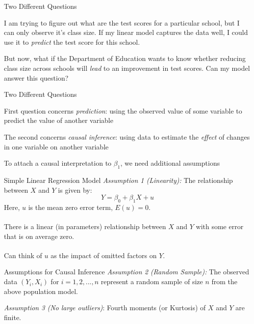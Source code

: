 \documentclass{./../div_teaching_slides}
\begin{document}

\begin{frame}{Two Different Questions}
\begin{witemize}
  \item I am trying to figure out what are the test scores for a particular school, but I can only observe it's class size. If my linear model captures the data well, I could use it to \textit{predict} the test score for this school.
  \item But now, what if the Department of Education wants to know whether reducing class size across schools will \textit{lead} to an improvement in test scores. Can my model answer this question?
\end{witemize}
\end{frame}

\begin{frame}{Two Different Questions}
\begin{witemize}
  \item First question concerns \textit{prediction}: using the observed value of some variable to predict the value of another variable
  \item The second concerns \textit{causal inference}: using data to estimate the \textit{effect} of changes in one variable on another variable
  \item To attach a causal interpretation to $\beta_1$, we need additional assumptions
\end{witemize}
\end{frame}

\begin{frame}{Simple Linear Regression Model}
\textit{Assumption 1 (Linearity):}
The relationship between $X$ and $Y$ is given by: 
$$ Y = \beta_0 + \beta_1 X + u $$
\vspace{1em}
Here, $u$ is the mean zero error term, $E(u)=0$. \\~\\
There is a linear (in parameters) relationship between $X$ and $Y$ with some error that is on average zero. \\~\\
Can think of $u$ as the impact of omitted factors on $Y$.
\end{frame}

\begin{frame}{Assumptions for Causal Inference}
\vspace{0.5cm}
\textit{Assumption 2 (Random Sample):} The observed data $(Y_i, X_i)$ for $i=1,2,...,n$ represent a random sample of size $n$ from the above population model. \\
\vspace{1.5cm}

\textit{Assumption 3 (No large outliers)}: Fourth moments (or Kurtosis) of $X$ and $Y$ are finite.
\end{frame}
\end{document}
